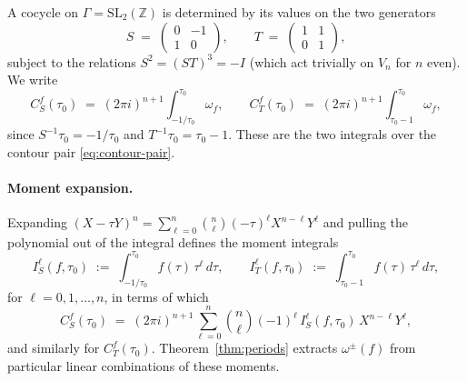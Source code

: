 \documentclass[11pt]{article}
\numberwithin{equation}{section}  %
\newcommand{\ZZ}{\mathbb{Z}}
\newcommand{\SLZ}{\mathrm{SL}_2(\ZZ)}
\begin{document}
A cocycle on $\Gamma = \SLZ$ is determined by its values on the two
generators
\begin{equation}
  S \;=\; \begin{pmatrix} 0 & -1 \\ 1 & 0\end{pmatrix},
  \qquad
  T \;=\; \begin{pmatrix} 1 & 1 \\ 0 & 1\end{pmatrix},
\end{equation}
subject to the relations $S^2 = (ST)^3 = -I$ (which act trivially on
$V_n$ for $n$ even).  We write
\begin{equation}\label{eq:CS-CT-def}
  C^f_S(\tau_0) \;=\; (2\pi i)^{n+1}\!\int_{-1/\tau_0}^{\tau_0}\!\omega_f,
  \qquad
  C^f_T(\tau_0) \;=\; (2\pi i)^{n+1}\!\int_{\tau_0 - 1}^{\tau_0}\!\omega_f,
\end{equation}
since $S^{-1}\tau_0 = -1/\tau_0$ and $T^{-1}\tau_0 = \tau_0 - 1$.
These are the two integrals over the contour pair
\eqref{eq:contour-pair}.

\paragraph{Moment expansion.}
Expanding $(X - \tau Y)^n = \sum_{\ell=0}^{n} \binom{n}{\ell}(-\tau)^\ell
X^{n-\ell} Y^\ell$ and pulling the polynomial out of the integral defines
the moment integrals
\begin{equation}\label{eq:moment-def}
  I_S^\ell(f, \tau_0) \;:=\; \int_{-1/\tau_0}^{\tau_0}\! f(\tau)\,\tau^\ell\,d\tau,
  \qquad
  I_T^\ell(f, \tau_0) \;:=\; \int_{\tau_0 - 1}^{\tau_0}\! f(\tau)\,\tau^\ell\,d\tau,
\end{equation}
for $\ell = 0, 1, \ldots, n$, in terms of which
\begin{equation}
  C^f_S(\tau_0)
  \;=\; (2\pi i)^{n+1}\!\sum_{\ell=0}^{n}\!\binom{n}{\ell}(-1)^\ell\,
  I_S^\ell(f, \tau_0)\,X^{n-\ell}Y^\ell,
\end{equation}
and similarly for $C^f_T(\tau_0)$.  Theorem~\ref{thm:periods} extracts
$\omega^\pm(f)$ from particular linear combinations of these moments.
\end{document}

